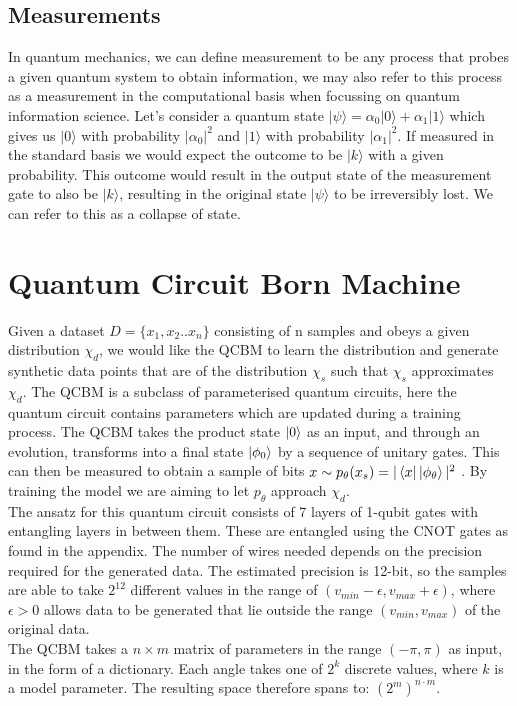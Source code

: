 \documentclass[12pt]{article}
\numberwithin{equation}{section}
\begin{document}
\subsection{Measurements}
In quantum mechanics, we can define measurement to be any process that probes a 
given quantum system to obtain information, we may also refer to this process as 
a measurement in the computational basis when focussing on quantum information 
science. Let's consider a quantum state 
$|\psi \rangle = \alpha_0|0\rangle+\alpha_1|1\rangle$ which gives us $|0\rangle$
with probability $|\alpha_0|^2$ and $|1\rangle$ with probability $|\alpha_1|^2$. 
If measured in the standard basis we would expect the outcome to be $|k\rangle$
with a given probability. This outcome would result in the output 
state of the measurement gate to also be $|k\rangle$, resulting in the original 
state $|\psi\rangle$ to be irreversibly lost. We can refer to this as a collapse of state. 

\clearpage
\section{Quantum Circuit Born Machine}
Given a dataset $D = \{x_1, x_2.. x_n\}$ consisting of n samples and obeys a 
given distribution $\chi_d$, we would like the QCBM to learn the distribution 
and generate synthetic data points that are of the distribution $\chi_s$ such that
$\chi_s$ approximates $\chi_d$.
The QCBM is a subclass of parameterised quantum circuits, 
here the quantum circuit contains parameters which are updated during a training 
process. The QCBM takes the product state $\ket{0}$ as an input, and through an 
evolution, transforms into a final state $\ket{\phi_0}$ by a sequence of unitary 
gates. This can then be measured to obtain a sample of bits 
$x \sim p_\theta (x_s)=|\bra{x}\ket{\phi_\theta}|^2$ . By training the model we 
are aiming to let $p_\theta$ approach $\chi_d$. 
\\
The ansatz for this quantum circuit consists of 7 layers
of 1-qubit gates with entangling layers in between them. These are 
entangled using the CNOT gates as found in the appendix. The number of wires 
needed depends on the precision required for the generated data. The estimated
precision is 12-bit, so the samples are able to take $2^{12}$ different values in 
the range of $ (v_{min} - \epsilon, v_{max} + \epsilon )$, where $\epsilon > 0 $
allows data to be generated that lie outside the range $(v_{min},v_{max})$ of the 
original data.
\\
The QCBM takes a $n \times m$ matrix of parameters in the range $(-\pi, \pi)$ as 
input, in the form of a dictionary. Each angle takes one of $2^k$ discrete values, 
where $k$ is a model parameter. The resulting space therefore spans to: 
$(2^m)^{n\cdot m}$.
\end{document}
